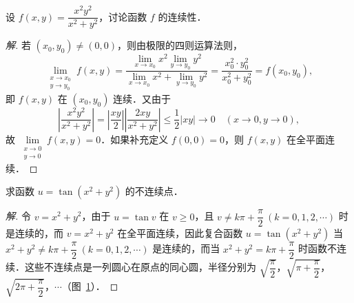 \begin{example}\label{ex:15-2-11}
设 $f(x,y)=\dfrac{x^{2}y^{2}}{x^{2}+y^{2}}$，讨论函数 $f$ 的连续性．
\end{example}

\begin{proof}[解]
若 $(x_{0},y_{0})\neq(0,0)$，则由极限的四则运算法则，
\[
\lim_{\substack{x\to x_{0}\\ y\to y_{0}}}f(x,y)=\dfrac{\lim\limits_{x\to x_{0}}x^{2}\lim\limits_{y\to y_{0}}y^{2}}{\lim\limits_{x\to x_{0}}x^{2}+\lim\limits_{y\to y_{0}}y^{2}}=\dfrac{x_{0}^{2}\cdot y_{0}^{2}}{x_{0}^{2}+y_{0}^{2}}=f(x_{0},y_{0}),
\]
即 $f(x,y)$ 在 $(x_{0},y_{0})$ 连续．又由于
\[
\left|\dfrac{x^{2}y^{2}}{x^{2}+y^{2}}\right|=\left|\dfrac{xy}{2}\right|\left|\dfrac{2xy}{x^{2}+y^{2}}\right|\leqslant\dfrac{1}{2}\left|xy\right|\to0\quad(x\to0,y\to0),
\]
故 $\lim\limits_{\substack{x\to0\\y\to0}}f(x,y)=0$．如果补充定义 $f(0,0)=0$，则 $f(x,y)$ 在全平面连续．
\end{proof}

\begin{example}\label{ex:15-2-12}
求函数 $u=\tan(x^{2}+y^{2})$ 的不连续点．
\end{example}

\begin{proof}[解]
令 $v=x^{2}+y^{2}$，由于 $u=\tan v$ 在 $v\geqslant0$，且 $v\neq k\pi+\dfrac{\pi}{2}\ (k=0,1,2,\cdots)$ 时是连续的，而 $v=x^{2}+y^{2}$ 在全平面连续，因此复合函数 $u=\tan(x^{2}+y^{2})$ 当 $x^{2}+y^{2}\neq k\pi+\dfrac{\pi}{2}\ (k=0,1,2,\cdots)$ 是连续的，而当 $x^{2}+y^{2}=k\pi+\dfrac{\pi}{2}$ 时函数不连续．这些不连续点是一列圆心在原点的同心圆，半径分别为 $\sqrt{\dfrac{\pi}{2}}$，$\sqrt{\pi+\dfrac{\pi}{2}}$，$\sqrt{2\pi+\dfrac{\pi}{2}}$，$\cdots$（图~\ref{fig:15-19}）．
\end{proof}

\begin{figure}[htbp]
\centering
{}\caption{\relax}\label{fig:15-19}
\end{figure}

